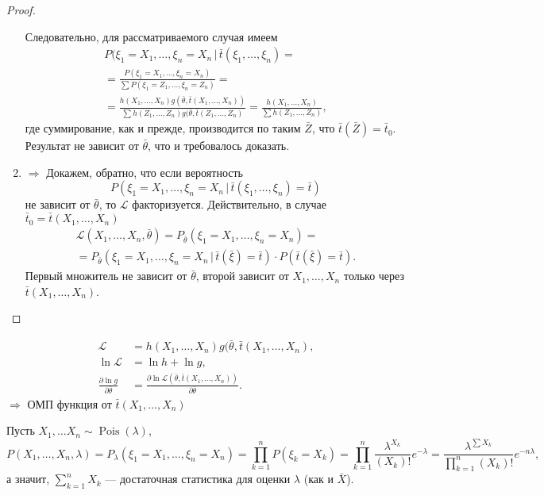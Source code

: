 \begin{proof}
\begin{enumerate}
Следовательно, для рассматриваемого случая имеем
\begin{multline*}
    P(\xi_1 = X_1, \dots, \xi_n = X_n \, | \, \bar t (\xi_1, \dots, \xi_n) =\\=
		\frac{P(\xi_1 = X_1, \ldots, \xi_n = X_n)}{\sum P(\xi_1 = Z_1, \ldots, \xi_n = Z_n)} =\\= \frac{h(X_1, \dots, X_n)
		g(\bar \theta, \bar t(X_1, \dots, X_n))}{\sum h(Z_1, \dots, Z_n)
		g(\bar\theta, \bar t(Z_1, \dots, Z_n)} = \frac{h(X_1, \dots, X_n)}{\sum h(Z_1,
		\dots, Z_n)},
\end{multline*}
где суммирование, как и прежде, производится по таким $ \bar Z $, что $ \bar
t(\bar Z) = \bar t_0 $. Результат не зависит от $ \bar \theta $, что и
требовалось доказать.
\item $\boxed{\Rightarrow}$
  Докажем, обратно, что если вероятность
	\[
		P(\xi_1 = X_1, \dots, \xi_n = X_n \,| \,\bar
		t(\xi_1, \dots, \xi_n)
		= \bar t)
	\]
	не зависит от $\bar \theta$, то $\mathscr{L}$ факторизуется. Действительно, в
	случае $ \bar t_0 = \bar t(X_1, \ldots, X_n) $
  \begin{multline*}
    \mathscr{L} (X_1, \dots, X_n, \bar\theta) = P_{\bar\theta} (\xi_1 = X_1,
		\dots, \xi_n = X_n) =\\= P_{\bar\theta} (\xi_1 = X_1, \dots, \xi_n = X_n \,
		|\, \bar
		t(\bar\xi) = \bar t) \cdot P(\bar t(\bar\xi) = \bar t).
  \end{multline*}
  Первый множитель не зависит от $\bar\theta$, второй зависит от $X_1, \dots,
	X_n$ только через $\bar t(X_1, \dots, X_n)$.
\end{enumerate}
\end{proof}

\begin{remark}
  \begin{align*}
		\mathscr{L} &= h(X_1, \dots, X_n) g(\bar\theta, \bar t(X_1, \dots, X_n),\\
		\ln \mathscr{L} &= \ln h + \ln g,\\
		\frac{\partial \ln g}{\partial \bar \theta} &= \frac{\partial \ln \mathscr{L} (\bar\theta, \bar t(X_1, \dots,
	X_n))}{\partial \bar\theta}.
  \end{align*}
  $\Rightarrow$ ОМП функция от $\bar t(X_1, \dots, X_n)$
\end{remark}

\begin{ex}
	Пусть $X_1, \dots X_n \sim \operatorname{Pois}(\lambda)$, 
  \[
    P(X_1, \dots, X_n, \lambda) = P_\lambda (\xi_1=X_1, \dots, \xi_n=X_n) =
		\prod_{k=1}^n P(\xi_k = X_k) = \prod_{k=1}^n \frac{\lambda^{X_k}}{(X_k)!}
		e^{-\lambda} =
		\frac{\lambda^{\sum X_k}}{\prod_{k=1}^n (X_k)!}  e^{-n\lambda},
  \]
	а значит, $\sum_{k=1}^n X_k$ --- достаточная статистика для оценки $\lambda$
	(как и $\bar X$).
\end{ex}

